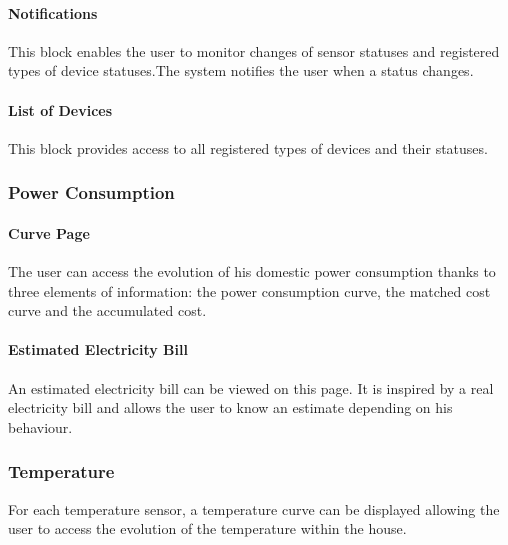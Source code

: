    \paragraph{Notifications}
    This block enables the user to monitor changes of sensor statuses and registered types of device statuses.The system notifies the user when a status changes.
    \paragraph{List of Devices} %
    This block provides access to all registered types of devices and their statuses.

\subsubsection{Power Consumption}

    \paragraph{Curve Page}
    The user can access the evolution of his domestic power consumption thanks to three elements of information: the power consumption curve, the matched cost curve and the accumulated cost.
    
    \paragraph{Estimated Electricity Bill}
    An estimated electricity bill can be viewed on this page. It is inspired by a real electricity bill and allows the user to know an estimate depending on his behaviour.
\subsubsection{Temperature}
    For each temperature sensor, a temperature curve can be displayed allowing the user to access the evolution of the temperature within the house. 
